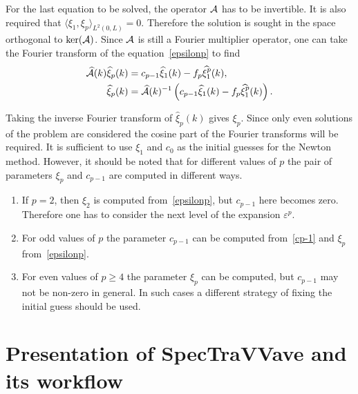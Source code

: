 	For the last equation to be solved, the operator $\mathcal{A}$ has to be invertible. It is also required that $\langle\xi_1, \xi_p\rangle_{L^2(0,L)}=0$. 
	Therefore the solution is sought in the space orthogonal to $\ker(\mathcal{A})$.
	Since $\mathcal{A}$ is still a Fourier multiplier operator, one can take the Fourier transform of the equation~\eqref{epsilonp} to find
\begin{align*}
	\widehat{\mathcal{A}}(k) \widehat\xi_p(k)& = c_{p-1}\widehat\xi_1(k) - f_p				
	\widehat{\xi_1^p}(k), \\
	\widehat\xi_p(k)& = \widehat{\mathcal{A}}(k)^{-1} \left(c_{p-1}\widehat\xi_1(k) - f_p	
	\widehat{\xi_1^p}(k)\right).
\end{align*}
	 
Taking the inverse Fourier transform of $\widehat\xi_p(k)$ gives $\xi_p$.
Since only even solutions of the problem are considered the cosine part of the Fourier transforms will be required.
It is sufficient to use $\xi_1$ and $c_0$ as the initial guesses for the Newton method. However, it should be noted that for different values of $p$ the pair of parameters $\xi_p$ and $c_{p-1}$ are computed in different ways.
\begin{enumerate}[label=\alph*)]
	\item If $p = 2$, then $\xi_2$ is computed from~\eqref{epsilonp}, but $c_{p-1}$ here becomes zero. Therefore one has to consider the next level of the expansion $\varepsilon^p$.
	\item For odd values of $p$ the parameter $c_{p-1}$ can be computed from~\eqref{cp-1} and $\xi_p$ from~\eqref{epsilonp}.
	\item For even values of $p \geq 4$ the parameter $\xi_p$ can be computed, but $c_{p-1}$ may not be non-zero in general. 
	In such cases a different strategy of fixing the initial guess should be used.
\end{enumerate}




\section{Presentation of \textsf{SpecTraVVave} and its workflow}
\label{sec:implementation}
 
